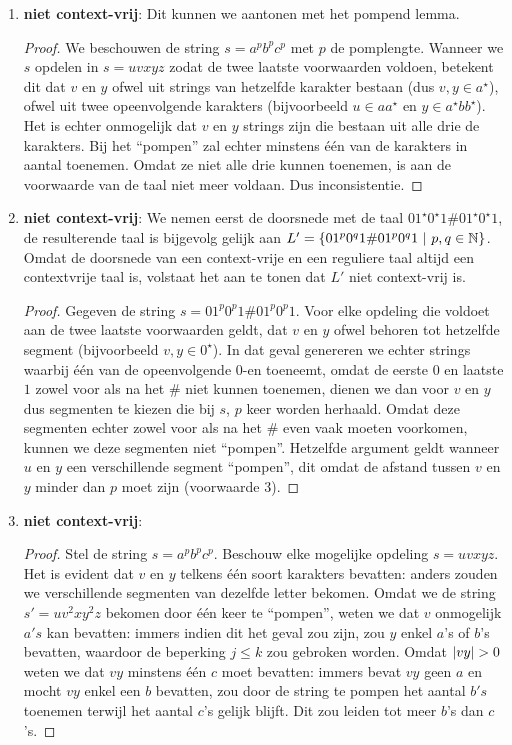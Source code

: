 \documentclass[a4paper]{article}
\begin{document}
\begin{question}
\begin{answer}
\begin{enumerate}
\begin{proof}
\end{proof}
\item \textbf{niet context-vrij}: Dit kunnen we aantonen met het pompend lemma.
\begin{proof}
We beschouwen de string $s=a^pb^pc^p$ met $p$ de pomplengte. Wanneer we $s$ opdelen in $s=uvxyz$ zodat de twee laatste voorwaarden voldoen, betekent dit dat $v$ en $y$ ofwel uit strings van hetzelfde karakter bestaan (dus $v,y\in a^{\star}$), ofwel uit twee opeenvolgende karakters (bijvoorbeeld $u\in aa^{\star}$ en $y\in a^{\star}bb^{\star}$). Het is echter onmogelijk dat $v$ en $y$ strings zijn die bestaan uit alle drie de karakters. Bij het ``pompen'' zal echter minstens \'e\'en van de karakters in aantal toenemen. Omdat ze niet alle drie kunnen toenemen, is aan de voorwaarde van de taal niet meer voldaan. Dus inconsistentie.
\end{proof}
\item \textbf{niet context-vrij}: We nemen eerst de doorsnede met de taal $01^{\star}0^{\star}1\#01^{\star}0^{\star}1$, de resulterende taal is bijgevolg gelijk aan $L'=\left\{ 01^p0^q1\#01^p0^q1\ |\ p,q\in\mathbb{N} \right\}$. Omdat de doorsnede van een context-vrije en een reguliere taal altijd een contextvrije taal is, volstaat het aan te tonen dat $L'$ niet context-vrij is.
\begin{proof}
Gegeven de string $s=01^p0^p1\#01^p0^p1$. Voor elke opdeling die voldoet aan de twee laatste voorwaarden geldt, dat $v$ en $y$ ofwel behoren tot hetzelfde segment (bijvoorbeeld $v,y\in 0^{\star}$). In dat geval genereren we echter strings waarbij \'e\'en van de opeenvolgende $0$-en toeneemt, omdat de eerste $0$ en laatste $1$ zowel voor als na het $\#$ niet kunnen toenemen, dienen we dan voor $v$ en $y$ dus segmenten te kiezen die bij $s$, $p$ keer worden herhaald. Omdat deze segmenten echter zowel voor als na het $\#$ even vaak moeten voorkomen, kunnen we deze segmenten niet ``pompen''. Hetzelfde argument geldt wanneer $u$ en $y$ een verschillende segment ``pompen'', dit omdat de afstand tussen $v$ en $y$ minder dan $p$ moet zijn (voorwaarde $3$).
\end{proof}
\item \textbf{niet context-vrij}:
\begin{proof}
Stel de string $s=a^pb^pc^p$. Beschouw elke mogelijke opdeling $s=uvxyz$. Het is evident dat $v$ en $y$ telkens \'e\'en soort karakters bevatten: anders zouden we verschillende segmenten van dezelfde letter bekomen. Omdat we de string $s'=uv^2xy^2z$ bekomen door \'e\'en keer te ``pompen'', weten we dat $v$ onmogelijk $a's$ kan bevatten: immers indien dit het geval zou zijn, zou $y$ enkel $a$'s of $b$'s bevatten, waardoor de beperking $j\leq k$ zou gebroken worden. Omdat $\abs{vy}>0$ weten we dat $vy$ minstens \'e\'en $c$ moet bevatten: immers bevat $vy$ geen $a$ en mocht $vy$ enkel een $b$ bevatten, zou door de string te pompen het aantal $b's$ toenemen terwijl het aantal $c$'s gelijk blijft. Dit zou leiden tot meer $b$'s dan $c$'s.

\end{proof}
\end{enumerate}
\end{answer}
\end{question}
\end{document}
